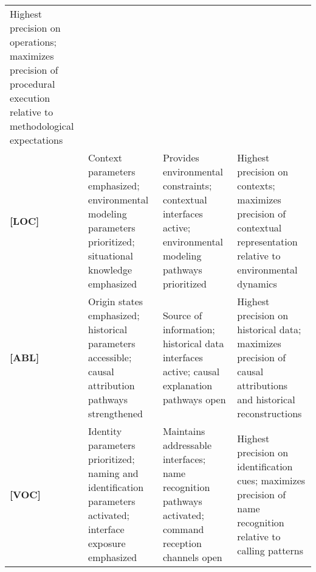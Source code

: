\begin{longtable}[]{@{}llll@{}}
\begin{minipage}[t]{0.24\columnwidth}
Highest precision on operations; maximizes precision of procedural
execution relative to methodological expectations\strut
\end{minipage}\tabularnewline
\begin{minipage}[t]{0.08\columnwidth}\raggedright
\textbf{{[}LOC{]}}\strut
\end{minipage} & \begin{minipage}[t]{0.24\columnwidth}\raggedright
Context parameters emphasized; environmental modeling parameters
prioritized; situational knowledge emphasized\strut
\end{minipage} & \begin{minipage}[t]{0.33\columnwidth}\raggedright
Provides environmental constraints; contextual interfaces active;
environmental modeling pathways prioritized\strut
\end{minipage} & \begin{minipage}[t]{0.24\columnwidth}\raggedright
Highest precision on contexts; maximizes precision of contextual
representation relative to environmental dynamics\strut
\end{minipage}\tabularnewline
\begin{minipage}[t]{0.08\columnwidth}\raggedright
\textbf{{[}ABL{]}}\strut
\end{minipage} & \begin{minipage}[t]{0.24\columnwidth}\raggedright
Origin states emphasized; historical parameters accessible; causal
attribution pathways strengthened\strut
\end{minipage} & \begin{minipage}[t]{0.33\columnwidth}\raggedright
Source of information; historical data interfaces active; causal
explanation pathways open\strut
\end{minipage} & \begin{minipage}[t]{0.24\columnwidth}\raggedright
Highest precision on historical data; maximizes precision of causal
attributions and historical reconstructions\strut
\end{minipage}\tabularnewline
\begin{minipage}[t]{0.08\columnwidth}\raggedright
\textbf{{[}VOC{]}}\strut
\end{minipage} & \begin{minipage}[t]{0.24\columnwidth}\raggedright
Identity parameters prioritized; naming and identification parameters
activated; interface exposure emphasized\strut
\end{minipage} & \begin{minipage}[t]{0.33\columnwidth}\raggedright
Maintains addressable interfaces; name recognition pathways activated;
command reception channels open\strut
\end{minipage} & \begin{minipage}[t]{0.24\columnwidth}\raggedright
Highest precision on identification cues; maximizes precision of name
recognition relative to calling patterns\strut
\end{minipage}\tabularnewline
\bottomrule
\end{longtable}

